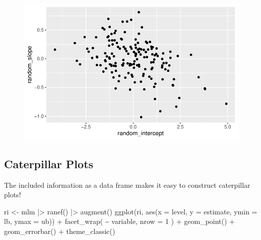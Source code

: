 \documentclass[
  letterpaper,
  DIV=11,
  numbers=noendperiod]{scrreprt}
\newenvironment{Shaded}{\begin{snugshade}}{\end{snugshade}}
\newcommand{\AttributeTok}[1]{\textcolor[rgb]{0.49,0.56,0.16}{#1}}
\newcommand{\DecValTok}[1]{\textcolor[rgb]{0.25,0.63,0.44}{#1}}
\newcommand{\FunctionTok}[1]{\textcolor[rgb]{0.02,0.16,0.49}{#1}}
\newcommand{\NormalTok}[1]{\textcolor[rgb]{0.00,0.44,0.13}{#1}}
\newcommand{\OtherTok}[1]{\textcolor[rgb]{0.00,0.44,0.13}{#1}}
\newcommand{\SpecialCharTok}[1]{\textcolor[rgb]{0.25,0.44,0.63}{#1}}
\begin{document}
\begin{figure}[H]

{\centering \includegraphics{broom_files/figure-pdf/unnamed-chunk-10-1.pdf}

}

\end{figure}

\hypertarget{caterpillar-plots}{%
\subsection{Caterpillar Plots}\label{caterpillar-plots}}

The included information as a data frame makes it easy to construct
caterpillar plots!

\begin{Shaded}
\begin{Highlighting}[]
\NormalTok{ri }\OtherTok{\textless{}{-}}\NormalTok{ mlm }\SpecialCharTok{|\textgreater{}} 
  \FunctionTok{ranef}\NormalTok{() }\SpecialCharTok{|\textgreater{}} 
  \FunctionTok{augment}\NormalTok{() }
\FunctionTok{ggplot}\NormalTok{(ri, }\FunctionTok{aes}\NormalTok{(}\AttributeTok{x =}\NormalTok{ level, }\AttributeTok{y =}\NormalTok{ estimate,}
               \AttributeTok{ymin =}\NormalTok{ lb,}
               \AttributeTok{ymax =}\NormalTok{ ub)) }\SpecialCharTok{+}
  \FunctionTok{facet\_wrap}\NormalTok{( }\SpecialCharTok{\textasciitilde{}}\NormalTok{ variable, }\AttributeTok{nrow =} \DecValTok{1}\NormalTok{ ) }\SpecialCharTok{+}
  \FunctionTok{geom\_point}\NormalTok{() }\SpecialCharTok{+}
  \FunctionTok{geom\_errorbar}\NormalTok{() }\SpecialCharTok{+}
  \FunctionTok{theme\_classic}\NormalTok{()}
\end{Highlighting}
\end{Shaded}
\end{document}
